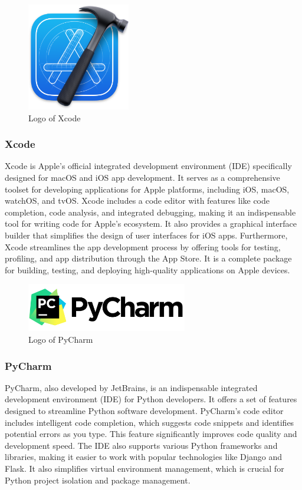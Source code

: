 \documentclass[conference]{IEEEtran}
\begin{document}
    
        \begin{figure}[htbp]
        \centerline{\includegraphics[width=4.5cm]{Images/logo/xcode.png}}
        \label{fig}
        \caption{Logo of Xcode}
        \end{figure}
        \subsubsection{Xcode}
         Xcode is Apple's official integrated development environment (IDE) specifically designed for macOS and iOS app development. It serves as a comprehensive toolset for developing applications for Apple platforms, including iOS, macOS, watchOS, and tvOS. Xcode includes a code editor with features like code completion, code analysis, and integrated debugging, making it an indispensable tool for writing code for Apple's ecosystem. It also provides a graphical interface builder that simplifies the design of user interfaces for iOS apps. Furthermore, Xcode streamlines the app development process by offering tools for testing, profiling, and app distribution through the App Store. It is a complete package for building, testing, and deploying high-quality applications on Apple devices.\\
    
        \begin{figure}[htbp]
        \centerline{\includegraphics[width=7cm]{Images/logo/pycharm.png}}
        \label{fig}
        \caption{Logo of PyCharm}
        \end{figure}
        \subsubsection{PyCharm}
        PyCharm, also developed by JetBrains, is an indispensable integrated development environment (IDE) for Python developers. It offers a set of features designed to streamline Python software development. PyCharm's code editor includes intelligent code completion, which suggests code snippets and identifies potential errors as you type. This feature significantly improves code quality and development speed. The IDE also supports various Python frameworks and libraries, making it easier to work with popular technologies like Django and Flask. It also simplifies virtual environment management, which is crucial for Python project isolation and package management.\\
        
\end{document}
